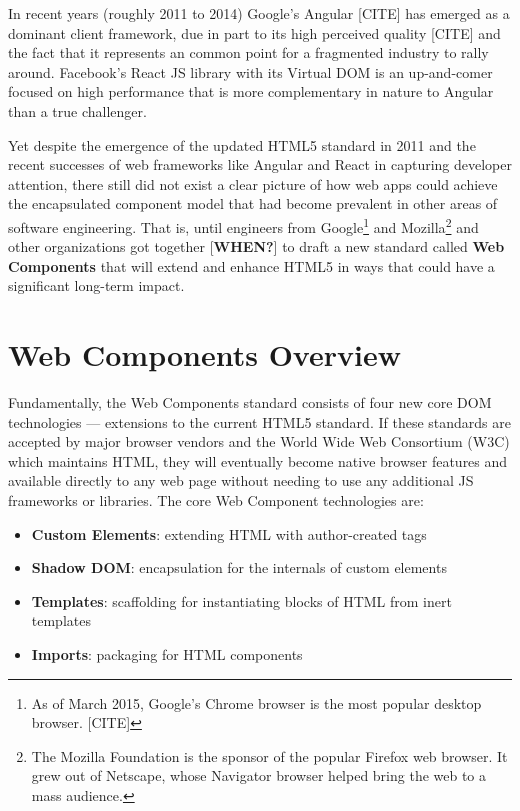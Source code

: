 In recent years (roughly 2011 to 2014) Google's Angular [CITE] 
has emerged as a dominant client framework, 
due in part to its high perceived quality [CITE] and the fact that it represents an common point for a fragmented industry to rally around.
Facebook's React 
JS library with its Virtual DOM is an up-and-comer focused on high performance that is more complementary in nature to Angular than a true challenger.

Yet despite the emergence of the updated HTML5 standard in 2011 and the recent successes of web frameworks like Angular and React in capturing developer attention, 
there still did not exist a clear picture of how web apps could achieve the encapsulated component model that had become prevalent in other areas of software engineering.
That is, until engineers from Google\footnote{
As of March 2015, Google's Chrome browser is the most popular desktop browser. [CITE]}
and Mozilla\footnote{
The Mozilla Foundation is the sponsor of the popular Firefox web browser. It grew out of Netscape, whose Navigator browser helped bring the web to a mass audience.}
and other organizations got together [\textbf{WHEN?}] to draft a new standard called \textbf{Web Components} that will extend and enhance HTML5 in ways that could have a significant long-term impact.

\section{Web Components Overview}
Fundamentally, the Web Components standard consists of four new core DOM technologies --- extensions to the current HTML5 standard.
If these standards are accepted by major browser vendors and the World Wide Web Consortium (W3C)
which maintains HTML, 
they will eventually become native browser features and available directly to any web page without needing to use any additional JS frameworks or libraries. 
The core Web Component technologies are:
\begin{itemize}
\item
\textbf{Custom Elements}: extending HTML with author-created tags
\item
\textbf{Shadow DOM}: encapsulation for the internals of custom elements
\item
\textbf{Templates}: scaffolding for instantiating blocks of HTML from inert templates
\item
\textbf{Imports}: packaging for HTML components
\end{itemize}

